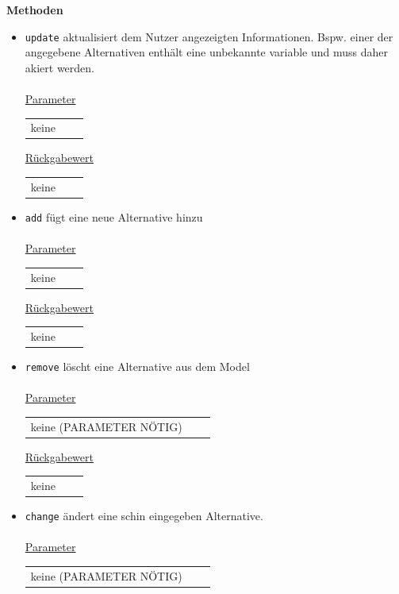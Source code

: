 \documentclass{article}
\begin{document}
\textbf{{Methoden}}
\begin{itemize}
\item \texttt{update} \newline aktualisiert dem Nutzer angezeigten Informationen. Bspw. einer der angegebene Alternativen enthält eine unbekannte variable und muss daher akiert werden.
\\\\
\underline{{Parameter}} 
\begin{tabular}{lll}
keine
\end{tabular}

\underline{{Rückgabewert}}
\begin{tabular}{lll}
keine
\end{tabular}

\item \texttt{add} \newline fügt eine neue Alternative hinzu
\\\\
\underline{{Parameter}} 
\begin{tabular}{lll}
keine
\end{tabular}

\underline{{Rückgabewert}}
\begin{tabular}{lll}
keine
\end{tabular}

\item \texttt{remove} \newline löscht eine Alternative aus dem Model
\\\\
\underline{{Parameter}} 
\begin{tabular}{lll}
keine (PARAMETER NÖTIG) \\
\end{tabular}

\underline{{Rückgabewert}}
\begin{tabular}{lll}
keine\\
\end{tabular}

\item \texttt{change} \newline ändert eine schin eingegeben Alternative.
\\\\
\underline{{Parameter}} 
\begin{tabular}{lll}
keine (PARAMETER NÖTIG)\\
\end{tabular}


\end{itemize}
\end{document}
